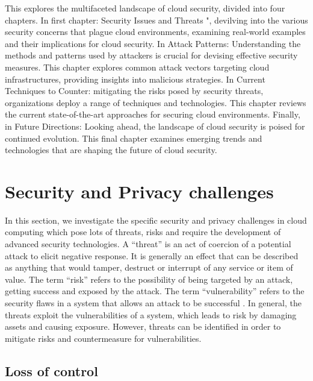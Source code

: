 \documentclass[twocolumn]{article}
\begin{document}
\textcolor{red}{\lipsum[1]}

This explores the multifaceted landscape of cloud security, divided into four chapters. In first chapter: Security Issues and Threats ", devilving into the various security concerns that plague cloud environments, examining real-world examples and their implications for cloud security. In Attack Patterns: Understanding the methods and patterns used by attackers is crucial for devising effective security measures. This chapter explores common attack vectors targeting cloud infrastructures, providing insights into malicious strategies. In Current Techniques to Counter: mitigating the risks posed by security threats, organizations deploy a range of techniques and technologies. This chapter reviews the current state-of-the-art approaches for securing cloud environments. Finally, in Future Directions: Looking ahead, the landscape of cloud security is poised for continued evolution. This final chapter examines emerging trends and technologies that are shaping the future of cloud security.

\section{Security and Privacy challenges}

In this section, we investigate the specific security and privacy challenges in cloud computing which pose lots of threats, risks and require the development of advanced security technologies.
A “threat” is an act of coercion of a potential attack to elicit negative response. It is generally an effect that can be described as anything that would tamper, destruct or interrupt of any service or item of value. The term “risk” refers to the possibility of being targeted by an attack, getting success and exposed by the attack. The term “vulnerability” refers to the security flaws in a system that allows an attack to be successful . In general, the threats exploit the vulnerabilities of a system, which leads to risk by damaging assets and causing exposure. However, threats can be identified in order to mitigate risks and countermeasure for vulnerabilities.

\subsection{Loss of control}
\end{document}
